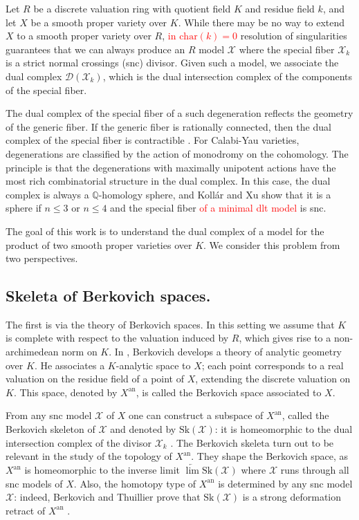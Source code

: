 \documentclass{amsart}%
\numberwithin{equation}{subsection}
\theoremstyle{plain2}
\theoremstyle{definition2}
\theoremstyle{stepstyle}
\theoremstyle{point}
\theoremstyle{subpoint}
\newcommand{\D}{{\mathcal D}}
\newcommand{\cX}{\ensuremath{\mathscr{X}}}
\newcommand{\an}{\mathrm{an}}
\newcommand{\Sk}{\mathrm{Sk}}
\begin{document}
Let $R$ be a discrete valuation ring with quotient field $K$ and residue field $k$, and let $X$ be a smooth proper variety over $K$. While there may be no way to extend $X$ to a smooth proper variety over $R$, \textcolor{red}{in $\text{char}(k)=0$} resolution of singularities guarantees that we can always produce an $R$ model $\cX$ where the special fiber $\cX_k$ is a strict normal crossings (snc) divisor. Given such a model, we associate the dual complex $\D(\cX_k)$, which is the dual intersection complex of the components of the special fiber. 

The dual complex of the special fiber of a such degeneration reflects the geometry of the generic fiber. If the generic fiber is rationally connected, then the dual complex of the special fiber is contractible \cite{deFernexKollarXu2012}. For Calabi-Yau varieties, degenerations are classified by the action of monodromy on the cohomology. The principle is that the degenerations with maximally unipotent actions have the most rich combinatorial structure in the dual complex. In this case, the dual complex is always a $\mathbb{Q}$-homology sphere, and Koll{\'a}r and Xu \cite{KollarXu} show that it is a sphere if $n\leqslant 3$ or $n \leqslant 4$ and the special fiber \textcolor{red}{of a minimal dlt model} is snc. 

The goal of this work is to understand the dual complex of a model for the product of two smooth proper varieties over $K$. We consider this problem from two perspectives.

\subsection{Skeleta of Berkovich spaces.} The first is via the theory of Berkovich spaces. In this setting we assume that $K$ is complete with respect to the valuation induced by $R$, which gives rise to a non-archimedean norm on $K$. In \cite{Berkovich1990}, Berkovich develops a theory of analytic geometry over $K$. He associates a $K$-analytic space to $X$; each point corresponds to a real valuation on the residue field of a point of $X$, extending the discrete valuation on $K$. This space, denoted by $X^\an$, is called the Berkovich space associated to $X$.

From any snc model $\cX$ of $X$ one can construct a subspace of $X^\an$, called the Berkovich skeleton of $\cX$ and denoted by $\Sk(\cX)$: it is homeomorphic to the dual intersection complex of the divisor $\cX_k$ \cite{MustataNicaise}.
The Berkovich skeleta turn out to be relevant in the study of the topology of $X^\an$.  They shape the Berkovich space, as $X^\an$ is homeomorphic to the inverse limit $\underleftarrow{\lim}\Sk(\cX)$ where $\cX$ runs through all snc models of $X$. Also, the homotopy type of $X^\an$ is determined by any snc model $\cX$: indeed, Berkovich and Thuillier prove that $\Sk(\cX)$ is a strong deformation retract of $X^\an$ \cite{Berkovich1990, Thuillier2007}.
\end{document}
